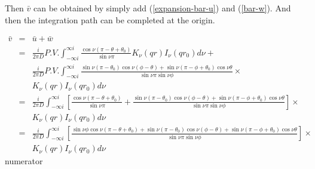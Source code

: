 \documentclass{article}
\begin{document}
Then $\bar{v}$ can be obtained by simply add (\ref{expansion-bar-u}) and
 (\ref{bar-w}). And then the integration path can be completed at the 
 origin.

\begin{eqnarray} 
    \bar{v} &=& \bar{u} + \bar{w} \nonumber \\
            &=& \frac{i}{2\pi D}P.V.\int^{\infty i}_{-\infty i}
                \frac{\cos\nu (\pi - \theta + \theta_0)}{\sin\nu\pi}
                K_\nu(qr)I_\nu(qr_0)d\nu +\nonumber \\
            & & \frac{i}{2\pi D}P.V.\int^{\infty i}_{-\infty i}
                \frac{\sin\nu(\pi - \theta_0)\cos\nu(\phi - \theta) +
                      \sin\nu(\pi-\phi+\theta_0)\cos\nu\theta}
                {\sin\nu\pi\sin\nu\phi}\times\nonumber \\
            & & K_\nu(qr)I_\nu(qr_0)d\nu \nonumber \\
            &=& \frac{i}{2\pi D}\int^{\infty i}_{-\infty i}\left[
                \frac{\cos\nu (\pi - \theta + \theta_0)}{\sin\nu\pi}+
                \frac{\sin\nu(\pi - \theta_0)\cos\nu(\phi - \theta) +
                      \sin\nu(\pi-\phi+\theta_0)\cos\nu\theta}
                     {\sin\nu\pi\sin\nu\phi}\right]\times\nonumber \\
            & & K_\nu(qr)I_\nu(qr_0)d\nu \nonumber \\
            &=& \frac{i}{2\pi D}\int^{\infty i}_{-\infty i}\left[
                \frac{\sin\nu\phi\cos\nu (\pi - \theta + \theta_0) +
                    \sin\nu(\pi - \theta_0)\cos\nu(\phi - \theta) +
                    \sin\nu(\pi-\phi+\theta_0)\cos\nu\theta}
                    {\sin\nu\pi\sin\nu\phi}\right]\times\nonumber \\
            & & K_\nu(qr)I_\nu(qr_0)d\nu \nonumber
\end{eqnarray}
numerator
\end{document}

